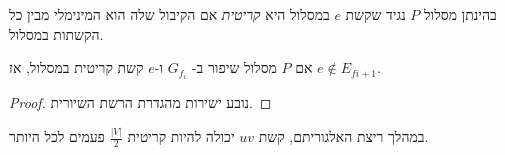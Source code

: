\begin{definition}
בהינתן מסלול $P$ נגיד שקשת $e$ במסלול היא 
\emph{קריטית}
אם הקיבול שלה הוא המינימלי מבין כל הקשתות במסלול.
\end{definition}

\begin{claim}
אם $P$ מסלול שיפור ב-%
$G_{f_i}$
ו-$e$ קשת קריטית במסלול, אז 
$e \notin E_{f{i + 1}}$.
\end{claim}

\begin{proof}
נובע ישירות מהגדרת הרשת השיורית.
\end{proof}

\begin{corollary}
במהלך ריצת האלגוריתם, קשת
$uv$
יכולה להיות קריטית 
$\frac{|V|}{2}$
פעמים לכל היותר.

\textbf{}
\end{corollary}
